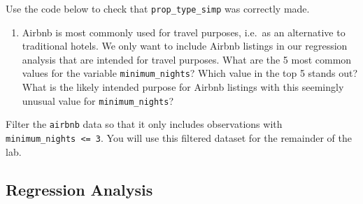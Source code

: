 \documentclass[]{book}
\newenvironment{Shaded}{\begin{snugshade}}{\end{snugshade}}
\newcommand{\KeywordTok}[1]{\textcolor[rgb]{0.13,0.29,0.53}{\textbf{#1}}}
\newcommand{\DataTypeTok}[1]{\textcolor[rgb]{0.13,0.29,0.53}{#1}}
\newcommand{\StringTok}[1]{\textcolor[rgb]{0.31,0.60,0.02}{#1}}
\newcommand{\OtherTok}[1]{\textcolor[rgb]{0.56,0.35,0.01}{#1}}
\newcommand{\OperatorTok}[1]{\textcolor[rgb]{0.81,0.36,0.00}{\textbf{#1}}}
\newcommand{\NormalTok}[1]{#1}
\providecommand{\tightlist}{%
  \setlength{\itemsep}{0pt}\setlength{\parskip}{0pt}}
\begin{document}
\begin{Shaded}
\end{Shaded}

Use the code below to check that \texttt{prop\_type\_simp} was correctly
made.

\begin{Shaded}
\end{Shaded}

\begin{enumerate}
\def\labelenumi{\arabic{enumi}.}
\setcounter{enumi}{7}
\tightlist
\item
  Airbnb is most commonly used for travel purposes, i.e.~as an
  alternative to traditional hotels. We only want to include Airbnb
  listings in our regression analysis that are intended for travel
  purposes. What are the 5 most common values for the variable
  \texttt{minimum\_nights}? Which value in the top 5 stands out? What is
  the likely intended purpose for Airbnb listings with this seemingly
  unusual value for \texttt{minimum\_nights}?
\end{enumerate}

Filter the \texttt{airbnb} data so that it only includes observations
with \texttt{minimum\_nights\ \textless{}=\ 3}. You will use this
filtered dataset for the remainder of the lab.

\subsection{Regression Analysis}\label{regression-analysis}
\end{document}
